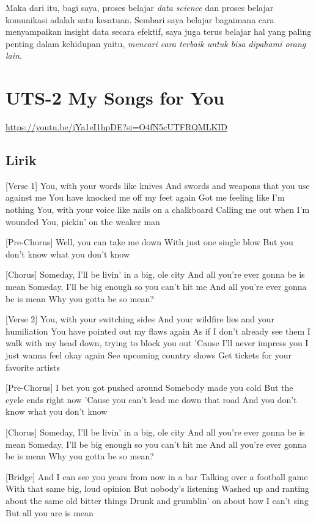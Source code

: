 \documentclass[
  letterpaper,
  DIV=11,
  numbers=noendperiod]{scrreprt}
\begin{document}
Maka dari itu, bagi saya, proses belajar \emph{data science} dan proses
belajar komunikasi adalah satu kesatuan. Sembari saya belajar bagaimana
cara menyampaikan insight data secara efektif, saya juga terus belajar
hal yang paling penting dalam kehidupan yaitu, \emph{mencari cara
terbaik untuk bisa dipahami orang lain}.


\chapter{UTS-2 My Songs for You}\label{uts-2-my-songs-for-you}

\url{https://youtu.be/jYa1eI1hpDE?si=O4fN5cUTFRQMLKID}

\section{Lirik}\label{lirik}

{[}Verse 1{]} You, with your words like knives And swords and weapons
that you use against me You have knocked me off my feet again Got me
feeling like I'm nothing You, with your voice like nails on a chalkboard
Calling me out when I'm wounded You, pickin' on the weaker man

{[}Pre-Chorus{]} Well, you can take me down With just one single blow
But you don't know what you don't know

{[}Chorus{]} Someday, I'll be livin' in a big, ole city And all you're
ever gonna be is mean Someday, I'll be big enough so you can't hit me
And all you're ever gonna be is mean Why you gotta be so mean?

{[}Verse 2{]} You, with your switching sides And your wildfire lies and
your humiliation You have pointed out my flaws again As if I don't
already see them I walk with my head down, trying to block you out
'Cause I'll never impress you I just wanna feel okay again See upcoming
country shows Get tickets for your favorite artists

{[}Pre-Chorus{]} I bet you got pushed around Somebody made you cold But
the cycle ends right now 'Cause you can't lead me down that road And you
don't know what you don't know

{[}Chorus{]} Someday, I'll be livin' in a big, ole city And all you're
ever gonna be is mean Someday, I'll be big enough so you can't hit me
And all you're ever gonna be is mean Why you gotta be so mean?

{[}Bridge{]} And I can see you years from now in a bar Talking over a
football game With that same big, loud opinion But nobody's listening
Washed up and ranting about the same old bitter things Drunk and
grumblin' on about how I can't sing But all you are is mean
\end{document}
